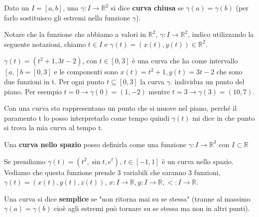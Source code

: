 \begin{definition}
Dato un $I = [a,b]$, una $\gamma: I \to \mathbb{R}^2$ si dice \textbf{curva chiusa} se $\gamma(a) = \gamma(b)$ (per farlo sostituisco gli estremi nella funzione $\gamma$).
\end{definition}

\begin{note}
Notare che la funzione che abbiamo a valori in $\mathbb{R}^2$, $\gamma: I \to \mathbb{R}^2$, indico utilizzando la seguente notazioni, chiamo $t \in I$ e $\gamma(t) = (x(t), y(t)) \in \mathbb{R}^2$.
\end{note}

\begin{example}
$\gamma(t) = (t^2 + 1, 3t -2)$, con $t \in [0,3]$ è una curva che ha come intervallo $[a,]b = [0,3]$ e le componenti sono $x(t) = t^2+1, y(t) = 3t-2$ che sono due funzioni in t. Per ogni punto $t \subseteq [0,3]$ la curva $\gamma$. individua un punto del piano. Per esempio $t = 0 \to \gamma(0) = (1,-2)$ mentre $t = 3 \to \gamma(3) = (10,7)$.
\end{example}
\hspace{-15pt}Con una curva sto rappresentano un punto che si muove nel piano, perché il paramento t lo posso interpretarlo come tempo quindi $\gamma(t)$ mi dice in che punto si trova la mia curva al tempo t.

\begin{definition}
Una \textbf{curva nello spazio} posso definirla come una funzione $\gamma: I \to \mathbb{R}^3$ con $I \subset \mathbb{R}$
\end{definition}

\begin{example}
Se prendiamo $\gamma(t) = (t^2, \sin{t}, e^t)$, $t \in [-1, 1]$ è un curva nello spazio. Vediamo che questa funzione prende 3 variabili che saranno 3 funzioni, $\gamma(t) = (x(t), y(t), z(t))$, $x: I\to \mathbb{R}, y: I\to \mathbb{R}, <: I\to \mathbb{R}$.
\end{example}

\begin{definition}
Una curva si dice \textbf{semplice} se "non ritorna mai su se stessa" (tranne al massimo $\gamma(a) = \gamma(b)$ cioè agli estremi può tornare su se stessa ma non in altri punti).
\end{definition}

